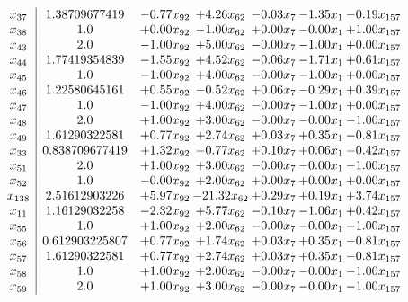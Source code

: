 \documentclass[8pt]{article}
\begin{document}
\[\begin{array}{c| c c@{\hskip 2pt} c@{\hskip 2pt} c@{\hskip 2pt} c@{\hskip 2pt} c@{\hskip 2pt} }
 x_{37}   &  1.38709677419 & -0.77 x_{92} & +  4.26 x_{62} & -0.03 x_{7} & -1.35 x_{1} & -0.19 x_{157}\\
 x_{38}   &  1.0 & +  0.00 x_{92} & -1.00 x_{62} & +  0.00 x_{7} & -0.00 x_{1} & +  1.00 x_{157}\\
 x_{43}   &  2.0 & -1.00 x_{92} & +  5.00 x_{62} & -0.00 x_{7} & -1.00 x_{1} & +  0.00 x_{157}\\
 x_{44}   &  1.77419354839 & -1.55 x_{92} & +  4.52 x_{62} & -0.06 x_{7} & -1.71 x_{1} & +  0.61 x_{157}\\
 x_{45}   &  1.0 & -1.00 x_{92} & +  4.00 x_{62} & -0.00 x_{7} & -1.00 x_{1} & +  0.00 x_{157}\\
 x_{46}   &  1.22580645161 & +  0.55 x_{92} & -0.52 x_{62} & +  0.06 x_{7} & -0.29 x_{1} & +  0.39 x_{157}\\
 x_{47}   &  1.0 & -1.00 x_{92} & +  4.00 x_{62} & -0.00 x_{7} & -1.00 x_{1} & +  0.00 x_{157}\\
 x_{48}   &  2.0 & +  1.00 x_{92} & +  3.00 x_{62} & -0.00 x_{7} & -0.00 x_{1} & -1.00 x_{157}\\
 x_{49}   &  1.61290322581 & +  0.77 x_{92} & +  2.74 x_{62} & +  0.03 x_{7} & +  0.35 x_{1} & -0.81 x_{157}\\
 x_{33}   &  0.838709677419 & +  1.32 x_{92} & -0.77 x_{62} & +  0.10 x_{7} & +  0.06 x_{1} & -0.42 x_{157}\\
 x_{51}   &  2.0 & +  1.00 x_{92} & +  3.00 x_{62} & -0.00 x_{7} & -0.00 x_{1} & -1.00 x_{157}\\
 x_{52}   &  1.0 & -0.00 x_{92} & +  2.00 x_{62} & +  0.00 x_{7} & +  0.00 x_{1} & +  0.00 x_{157}\\
 x_{138}   &  2.51612903226 & +  5.97 x_{92} & -21.32 x_{62} & +  0.29 x_{7} & +  0.19 x_{1} & +  3.74 x_{157}\\
 x_{11}   &  1.16129032258 & -2.32 x_{92} & +  5.77 x_{62} & -0.10 x_{7} & -1.06 x_{1} & +  0.42 x_{157}\\
 x_{55}   &  1.0 & +  1.00 x_{92} & +  2.00 x_{62} & -0.00 x_{7} & -0.00 x_{1} & -1.00 x_{157}\\
 x_{56}   &  0.612903225807 & +  0.77 x_{92} & +  1.74 x_{62} & +  0.03 x_{7} & +  0.35 x_{1} & -0.81 x_{157}\\
 x_{57}   &  1.61290322581 & +  0.77 x_{92} & +  2.74 x_{62} & +  0.03 x_{7} & +  0.35 x_{1} & -0.81 x_{157}\\
 x_{58}   &  1.0 & +  1.00 x_{92} & +  2.00 x_{62} & -0.00 x_{7} & -0.00 x_{1} & -1.00 x_{157}\\
 x_{59}   &  2.0 & +  1.00 x_{92} & +  3.00 x_{62} & -0.00 x_{7} & -0.00 x_{1} & -1.00 x_{157}\\

\end{array}\]
\end{document}
